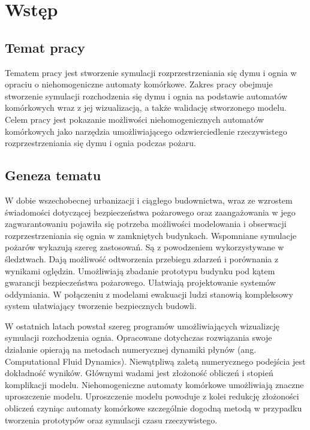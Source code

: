 \chapter{Wstęp}
\label{cha:wstep}

\section{Temat pracy} %

Tematem pracy jest stworzenie symulacji rozprzestrzeniania się dymu i ognia 
w opraciu o niehomogeniczne automaty komórkowe. Zakres pracy obejmuje stworzenie symulacji rozchodzenia się dymu i ognia na podstawie automatów komórkowych wraz z jej wizualizacją, a także walidację stworzonego modelu. 
Celem pracy jest pokazanie możliwości niehomogenicznych automatów komórkowych jako narzędzia umożliwiającego 
odzwierciedlenie rzeczywistego rozprzestrzeniania się dymu i ognia podczas pożaru. 

\section {Geneza tematu} %

W dobie wszechobecnej urbanizacji i ciągłego budownictwa, wraz ze wzrostem świadomości dotyczącej bezpieczeństwa
pożarowego oraz zaangażowania w jego zagwarantowaniu pojawiła się potrzeba możliwości modelowania i obserwacji rozprzestrzeniania się ognia w zamkniętych budynkach.
Wspomniane symulacje pożarów wykazują szereg zastosowań. Są z powodzeniem wykorzystywane w śledztwach. Dają możliwość odtworzenia przebiegu zdarzeń i porównania z wynikami oględzin. Umożliwiają
zbadanie prototypu budynku pod kątem gwarancji bezpieczeństwa pożarowego. 
Ułatwiają projektowanie systemów oddymiania. W połączeniu z modelami ewakuacji ludzi
stanowią kompleksowy system ułatwiający tworzenie bezpiecznych budowli.

W ostatnich latach powstał szereg programów umożliwiających wizualizcję symulacji rozchodzenia ognia. Opracowane dotychczas rozwiązania swoje działanie 
opierają na metodach numerycznej dynamiki płynów (ang. Computational Fluid Dynamics). Niewątpliwą zaletą numerycznego podejścia jest dokładność wyników. 
Głównymi wadami jest złożoność obliczeń i stopień komplikacji modelu. 
Niehomogeniczne automaty komórkowe umożliwiają znaczne uproszczenie modelu. Uproszczenie modelu powoduje z kolei redukcję złożoności
obliczeń czyniąc automaty komórkowe szczególnie dogodną metodą w przypadku tworzenia prototypów oraz symulacji czasu rzeczywistego.

